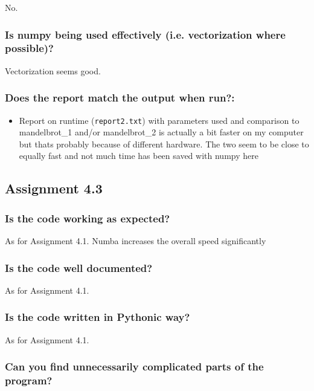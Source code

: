 \documentclass[a4paper]{article}
\begin{document}
No.

\subsubsection*{Is numpy being used effectively (i.e. vectorization where possible)?}

Vectorization seems good.

\subsubsection*{Does the report match the output when run?:}
\begin{itemize}
	\item Report on runtime (\texttt{report2.txt}) with parameters used and comparison to mandelbrot\_1 and/or mandelbrot\_2 is actually a bit faster on my computer but thats probably because of different hardware. The two seem to be close to equally fast and not much time has been saved with numpy here
\end{itemize}

\subsection*{Assignment 4.3}

\subsubsection*{Is the code working as expected?}

As for Assignment 4.1. Numba increases the overall speed significantly

\subsubsection*{Is the code well documented?}

As for Assignment 4.1.

\subsubsection*{Is the code written in Pythonic way?}

As for Assignment 4.1.

\subsubsection*{Can you find unnecessarily complicated parts of the program?}
\end{document}
